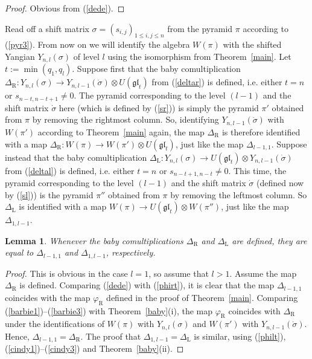 \documentclass[twoside,12pt,reqno]{amsart}
\newtheorem{Lemma}[Proposition]{Lemma}
\def\rt{{\operatorname{\scriptscriptstyle R}}}
\def\lt{{\operatorname{\scriptscriptstyle L}}}
\begin{document}
\begin{proof}
Obvious from (\ref{dede}).
\end{proof}

Read off a shift matrix $\sigma = (s_{i,j})_{1 \leq i,j \leq n}$
from the pyramid $\pi$ according to (\ref{pyr3}).
From now on we will identify the algebra
$W(\pi)$ with the shifted Yangian $Y_{n,l}(\sigma)$ of level $l$
using the isomorphism from Theorem~\ref{main}.
Let $t := \min(q_1,q_l)$.
Suppose first that 
the baby comultiplication $\Delta_{\rt}:
Y_{n,l}(\sigma)\rightarrow Y_{n,l-1}(\dot\sigma) \otimes U(\mathfrak{gl}_t)$ 
from (\ref{deltar}) is defined, i.e.
either $t=n$ or $s_{n-t,n-t+1} \neq 0$.
The pyramid corresponding to the level $(l-1)$
and the shift matrix $\dot\sigma$
here (which is defined by (\ref{sr})) is simply the pyramid $\pi'$ 
obtained from $\pi$ by removing the rightmost
column. So, identifying $Y_{n,l-1}(\dot\sigma)$ with $W(\pi')$
according to Theorem~\ref{main} again,
the map $\Delta_{\rt}$ is therefore identified with a map
$\Delta_{\rt}:W(\pi) \rightarrow W(\pi') \otimes U(\mathfrak{gl}_t)$,
just like the map $\Delta_{l-1,1}$.
Suppose instead that the baby comultiplication
$\Delta_{\lt}:Y_{n,l}(\sigma) \rightarrow U(\mathfrak{gl}_t)
\otimes Y_{n,l-1}(\dot\sigma)$ from (\ref{deltal})
is defined, i.e.
either $t=n$ or $s_{n-t+1,n-t} \neq 0$.
This time, 
the pyramid corresponding to the level $(l-1)$ and the
shift matrix $\dot\sigma$ (defined now by (\ref{sl}))
is the pyramid $\pi''$ 
obtained from $\pi$ by removing the leftmost
column.
So $\Delta_{\lt}$ is identified with a map
$W(\pi) \rightarrow U(\mathfrak{gl}_t) \otimes W(\pi'')$,
just like the map $\Delta_{1,l-1}$.

\begin{Lemma}\label{speccase}
Whenever the baby comultiplications 
$\Delta_{\rt}$ and $\Delta_{\lt}$ are defined, they are equal to
$\Delta_{l-1,1}$ and $\Delta_{1,l-1}$,
respectively.
\end{Lemma}

\begin{proof}
This is obvious in the case $l=1$, so assume that $l > 1$.
Assume the map $\Delta_{\rt}$ is defined.
Comparing (\ref{dede}) with (\ref{phirt}), it is clear
that the map $\Delta_{l-1,1}$ coincides with the map
$\varphi_{\rt}$ defined in the proof of Theorem~\ref{main}.
Comparing (\ref{barbie1})--(\ref{barbie3}) with
Theorem~\ref{baby}(i), the map $\varphi_{\rt}$
coincides with $\Delta_\rt$ under the identifications
of $W(\pi)$ with $Y_{n,l}(\sigma)$ and $W(\pi')$ 
with $Y_{n,l-1}(\dot\sigma)$.
Hence, $\Delta_{l-1,1} = \Delta_{\rt}$.
The proof that $\Delta_{1,l-1} = \Delta_{\lt}$ is similar,
using (\ref{philt}), (\ref{cindy1})--(\ref{cindy3})
and Theorem~\ref{baby}(ii).
\end{proof}
\end{document}
